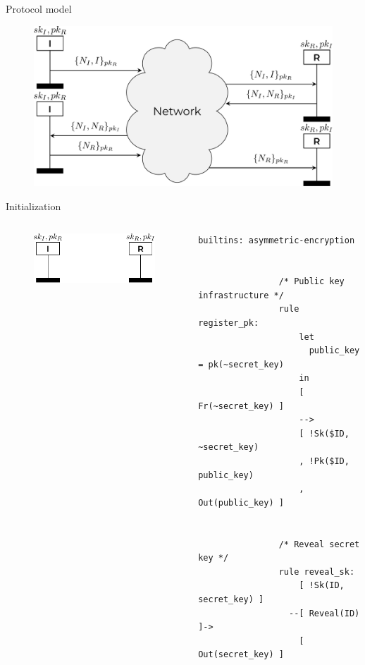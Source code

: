 \documentclass[11pt,aspectratio=169]{beamer}
\begin{document}
\begin{frame}[fragile]{Protocol model}
    \begin{figure}
        \includegraphics[width=.8\textwidth]{./figures/lecture_3/nspk_split_1}
    \end{figure}
\end{frame}

\begin{frame}[fragile]{Initialization}
    \begin{columns}
        \begin{column}{0.5\textwidth}
            \begin{figure}
                \includegraphics[width=.8\textwidth]
                    {./figures/lecture_3/nspk_init}
            \end{figure}
        \end{column}
        \begin{column}{0.5\textwidth}
            \begin{lstlisting}[style=tamarin, gobble=16]
                builtins: asymmetric-encryption


                /* Public key infrastructure */
                rule register_pk:
                    let
                      public_key = pk(~secret_key)
                    in
                    [ Fr(~secret_key) ]
                    -->
                    [ !Sk($ID, ~secret_key)
                    , !Pk($ID, public_key)
                    , Out(public_key) ]


                /* Reveal secret key */
                rule reveal_sk:
                    [ !Sk(ID, secret_key) ]
                  --[ Reveal(ID) ]->
                    [ Out(secret_key) ]
            \end{lstlisting}
        \end{column}
    \end{columns}
    \vsep
\end{frame}
\end{document}
